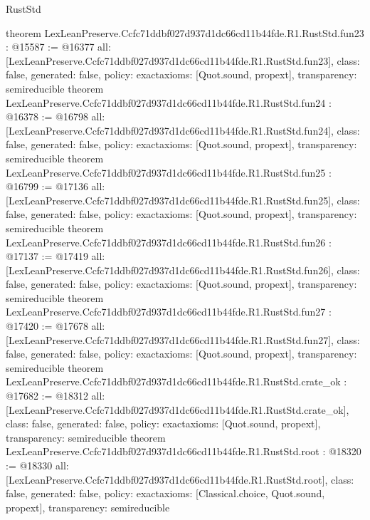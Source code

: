 \begin{lexlean}{RustStd}
\begin{coremodule}
{}
theorem LexLeanPreserve.Ccfc71ddbf027d937d1dc66cd11b44fde.R1.RustStd.fun23 : @15587 := @16377 {
  all: [LexLeanPreserve.Ccfc71ddbf027d937d1dc66cd11b44fde.R1.RustStd.fun23],
  class: false,
  generated: false,
  policy: exact{axioms: [Quot.sound, propext]},
  transparency: semireducible
}
theorem LexLeanPreserve.Ccfc71ddbf027d937d1dc66cd11b44fde.R1.RustStd.fun24 : @16378 := @16798 {
  all: [LexLeanPreserve.Ccfc71ddbf027d937d1dc66cd11b44fde.R1.RustStd.fun24],
  class: false,
  generated: false,
  policy: exact{axioms: [Quot.sound, propext]},
  transparency: semireducible
}
theorem LexLeanPreserve.Ccfc71ddbf027d937d1dc66cd11b44fde.R1.RustStd.fun25 : @16799 := @17136 {
  all: [LexLeanPreserve.Ccfc71ddbf027d937d1dc66cd11b44fde.R1.RustStd.fun25],
  class: false,
  generated: false,
  policy: exact{axioms: [Quot.sound, propext]},
  transparency: semireducible
}
theorem LexLeanPreserve.Ccfc71ddbf027d937d1dc66cd11b44fde.R1.RustStd.fun26 : @17137 := @17419 {
  all: [LexLeanPreserve.Ccfc71ddbf027d937d1dc66cd11b44fde.R1.RustStd.fun26],
  class: false,
  generated: false,
  policy: exact{axioms: [Quot.sound, propext]},
  transparency: semireducible
}
theorem LexLeanPreserve.Ccfc71ddbf027d937d1dc66cd11b44fde.R1.RustStd.fun27 : @17420 := @17678 {
  all: [LexLeanPreserve.Ccfc71ddbf027d937d1dc66cd11b44fde.R1.RustStd.fun27],
  class: false,
  generated: false,
  policy: exact{axioms: [Quot.sound, propext]},
  transparency: semireducible
}
theorem LexLeanPreserve.Ccfc71ddbf027d937d1dc66cd11b44fde.R1.RustStd.crate_ok : @17682 := @18312 {
  all: [LexLeanPreserve.Ccfc71ddbf027d937d1dc66cd11b44fde.R1.RustStd.crate_ok],
  class: false,
  generated: false,
  policy: exact{axioms: [Quot.sound, propext]},
  transparency: semireducible
}
theorem LexLeanPreserve.Ccfc71ddbf027d937d1dc66cd11b44fde.R1.RustStd.root : @18320 := @18330 {
  all: [LexLeanPreserve.Ccfc71ddbf027d937d1dc66cd11b44fde.R1.RustStd.root],
  class: false,
  generated: false,
  policy: exact{axioms: [Classical.choice, Quot.sound, propext]},
  transparency: semireducible
}


\end{coremodule}
\end{lexlean}
